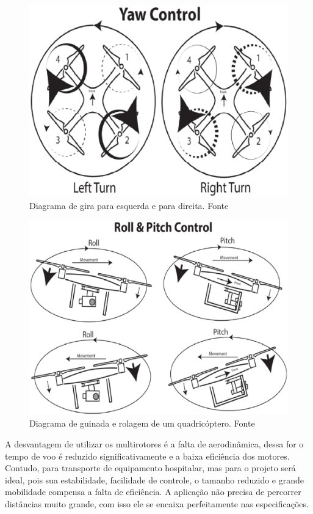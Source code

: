 \begin{figure}[H]
    \centering
      \includegraphics[keepaspectratio=true,scale=0.5]{figuras/gira.eps}
    \caption{Diagrama de gira para esquerda e para direita. Fonte \cite{audronis}}
    \label{fig:gira}
\end{figure}

\begin{figure}[H]
    \centering
      \includegraphics[keepaspectratio=true,scale=0.5]{figuras/guinada.eps}
    \caption[Diagrama de guinada e rolagem de um quadricóptero.]{Diagrama de guinada e rolagem de um quadricóptero. Fonte \cite{audronis}}
    \label{fig:guinada}
\end{figure}
A desvantagem de utilizar  os multirotores  é a  falta  de aerodinâmica,  dessa for o tempo de voo é reduzido significativamente e a baixa  
eficiência dos motores.  Contudo, para transporte de equipamento hospitalar, mas para o projeto será ideal, pois sua estabilidade, 
facilidade de controle, o tamanho reduzido e grande mobilidade compensa a falta de eficiência. A aplicação não precisa de percorrer 
distâncias muito grande, com isso ele se encaixa perfeitamente nas especificações.
